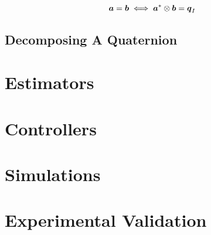 \begin{equation}
  \boldsymbol{a} = \boldsymbol{b} \iff \boldsymbol{a}^* \otimes \boldsymbol{b} = \boldsymbol{q}_I
\end{equation}


\subsection{Decomposing A Quaternion}
\label{subsec:DecomposingAQuaternion}


\section{Estimators}
\label{sec:Estimators}

\section{Controllers}
\label{sec:Controller}

\section{Simulations}
\label{sec:Simulations}

\section{Experimental Validation}
\label{sec:ExperimentalValidation}
